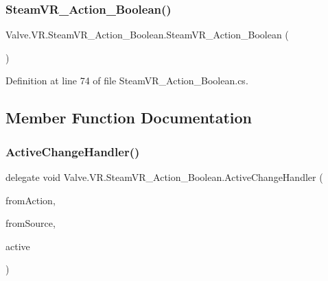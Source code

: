 \subsubsection{\texorpdfstring{SteamVR\_Action\_Boolean()}{SteamVR\_Action\_Boolean()}}
{\footnotesize\ttfamily Valve.\+V\+R.\+Steam\+V\+R\+\_\+\+Action\+\_\+\+Boolean.\+Steam\+V\+R\+\_\+\+Action\+\_\+\+Boolean (\begin{DoxyParamCaption}{ }\end{DoxyParamCaption})}



Definition at line 74 of file Steam\+V\+R\+\_\+\+Action\+\_\+\+Boolean.\+cs.



\subsection{Member Function Documentation}
\mbox{\label{class_valve_1_1_v_r_1_1_steam_v_r___action___boolean_af9f3044d5e4868485945b70d907c6bbb}} 
\subsubsection{\texorpdfstring{ActiveChangeHandler()}{ActiveChangeHandler()}}
{\footnotesize\ttfamily delegate void Valve.\+V\+R.\+Steam\+V\+R\+\_\+\+Action\+\_\+\+Boolean.\+Active\+Change\+Handler (\begin{DoxyParamCaption}\item[{\mbox{\hyperlink{class_valve_1_1_v_r_1_1_steam_v_r___action___boolean}{Steam\+V\+R\+\_\+\+Action\+\_\+\+Boolean}}}]{from\+Action,  }\item[{\mbox{\hyperlink{namespace_valve_1_1_v_r_a82e5bf501cc3aa155444ee3f0662853f}{Steam\+V\+R\+\_\+\+Input\+\_\+\+Sources}}}]{from\+Source,  }\item[{bool}]{active }\end{DoxyParamCaption})}

\mbox{\label{class_valve_1_1_v_r_1_1_steam_v_r___action___boolean_a0a88149176505a5fae559faf64494839}} 

